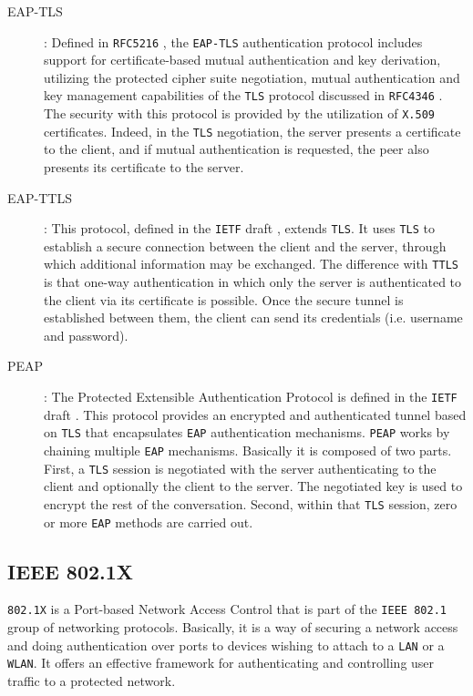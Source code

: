 \begin{description}
	\item [EAP-TLS]: Defined in \texttt{RFC5216} \cite{rfc5216}, the \texttt{EAP-TLS} authentication protocol includes support for certificate-based mutual authentication and key derivation, utilizing the protected cipher suite negotiation, mutual authentication and key management capabilities of the \texttt{TLS} protocol discussed in \texttt{RFC4346} \cite{rfc4346}. The security with this protocol is provided by the utilization of \texttt{X.509} certificates. Indeed, in the \texttt{TLS} negotiation, the server presents a certificate to the client, and if mutual authentication is requested, the peer also presents its certificate to the server.
	\item [EAP-TTLS]: This protocol, defined in the \texttt{IETF} draft \cite{ttls-draft}, extends \texttt{TLS}. It uses \texttt{TLS} to establish a secure connection between the client and the server, through which additional information may be exchanged. The difference with \texttt{TTLS} is that one-way authentication in which only the server is authenticated to the client via its certificate is possible. Once the secure tunnel is established between them, the client can send its credentials (i.e. username and password).
	\item [PEAP]: The Protected Extensible Authentication Protocol is defined in the \texttt{IETF} draft \cite{peap-draft}. This protocol provides an encrypted and authenticated tunnel based on \texttt{TLS} that encapsulates \texttt{EAP} authentication mechanisms. \texttt{PEAP} works by chaining multiple \texttt{EAP} mechanisms. Basically it is composed of two parts. First, a \texttt{TLS} session is negotiated with the server authenticating to the client and optionally the client to the server. The negotiated key is used to encrypt the rest of the conversation. Second, within that \texttt{TLS} session, zero or more \texttt{EAP} methods are carried out.
\end{description}


\subsection{IEEE 802.1X}
\texttt{802.1X} is a Port-based Network Access Control that is part of the \texttt{IEEE 802.1} group of networking protocols. Basically, it is a way of securing a network access and doing authentication over ports to devices wishing to attach to a \texttt{LAN} or a \texttt{WLAN}. It offers an effective framework for authenticating and controlling user traffic to a protected network.

